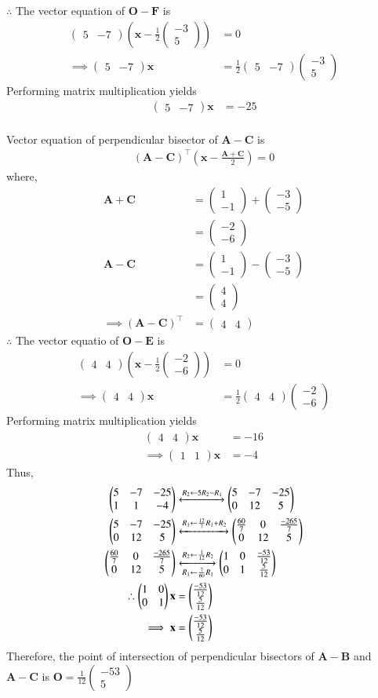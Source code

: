 \documentclass[journal,12pt,twocolumn]{IEEEtran}
\theoremstyle{remark}
\newcommand{\myvec}[1]{\ensuremath{\begin{pmatrix}#1\end{pmatrix}}}
\providecommand{\brak}[1]{\ensuremath{\left(#1\right)}}
\let\vec\mathbf
\begin{document}
$\therefore $ The vector equation of $\vec{O}-\vec{F}$ is
\begin{align}
\myvec{5&-7} \brak{ \vec{x}-\frac{1}{2}\myvec{-3\\5} }&=0\\
\implies \myvec{5&-7}\vec{x}&=\frac{1}{2}\myvec{5&-7}\myvec{-3\\5}
\end{align}
Performing matrix multiplication yields
\begin{align}
\myvec{5&-7}\vec{x}&=-25
\end{align}\\
Vector equation of perpendicular bisector of $\vec{A}-\vec{C}$ is
\begin{align}
(\vec{A}-\vec{C})^\top\brak{ \vec{x} - \frac{\vec{A}+\vec{C}}{2}} = 0
\end{align}
where,
\begin{align}
\vec{A}+\vec{C}&=\myvec{1\\-1}+\myvec{-3\\-5}\\
&=\myvec{-2\\-6}\\
\vec{A}-\vec{C} &= \myvec{1\\-1}-\myvec{-3\\-5}\\
&=\myvec{4\\4}\\
\implies (\vec{A}-\vec{C})^\top &= \myvec{4&4}
\end{align}
$\therefore $ The vector equatio of $\vec{O}-\vec{E}$ is
\begin{align}
\myvec{4&4}\brak{ \vec{x}-\frac{1}{2}\myvec{-2\\-6}}&=0\\
\implies \myvec{4&4}\vec{x}&=\frac{1}{2}\myvec{4&4}\myvec{-2\\-6}
\end{align}
Performing matrix multiplication yields
\begin{align}
\myvec{4&4}\vec{x}&=-16\\
\implies \myvec{1&1}\vec{x}&=-4
\end{align}
Thus,
\begin{align}
\myvec{5&-7&-25\\1&1&-4} &\xleftrightarrow[]{R_2 \leftarrow 5R_2 - R_1} \myvec{5&-7&-25\\0&12&5}\\
\myvec{5&-7&-25\\0&12&5} &\xleftrightarrow[]{R_1\leftarrow \frac{12}{7}R_1 + R_2} \myvec{\frac{60}{7}&0& \frac{-265}{7}\\0&12&5}\\
\myvec{\frac{60}{7}&0& \frac{-265}{7}\\0&12&5} &\xleftrightarrow[R_1\leftarrow \frac{7}{60}R_1]{R_2 \leftarrow \frac{1}{12}R_2} \myvec{1&0& \frac{-53}{12}\\0&1&\frac{5}{12}}\\
\therefore \myvec{1&0\\0&1}\vec{x} &= \myvec{\frac{-53}{12}\\\frac{5}{12}}\\
\implies \vec{x}&=\myvec{\frac{-53}{12}\\\frac{5}{12}}
\end{align}
Therefore, the point of intersection of perpendicular bisectors of $\vec{A}-\vec{B}$ and $\vec{A}-\vec{C}$ is $\vec{O} = \frac{1}{12}\myvec{-53\\5}$
\end{document}
